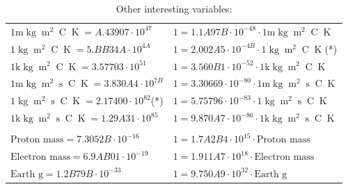 \begin{center}
\begin{longtable}{l l}
{\color{gray}$1 \bm{\mathrm{ m}}\operatorname{kg}{\operatorname{m}^2}{}{\operatorname{C}}{\operatorname{K}} = A.43907\cdot10^{47} $}   & {\color{gray}$ 1 = 1.1A97B\cdot10^{-48} \cdot 1 \bm{\mathrm{ m}}\operatorname{kg}{\operatorname{m}^2}{}{\operatorname{C}}{\operatorname{K}}$}  \\
{\color{black}$1 \bm{\mathrm{ }}\operatorname{kg}{\operatorname{m}^2}{}{\operatorname{C}}{\operatorname{K}} = 5.BB34A\cdot10^{4A} $}   & {\color{black}$ 1 = 2.002A5\cdot10^{-4B} \cdot 1 \bm{\mathrm{ }}\operatorname{kg}{\operatorname{m}^2}{}{\operatorname{C}}{\operatorname{K}}$}\quad(*)\\
{\color{gray}$1 \bm{\mathrm{ k}}\operatorname{kg}{\operatorname{m}^2}{}{\operatorname{C}}{\operatorname{K}} = 3.57703\cdot10^{51} $}   & {\color{gray}$ 1 = 3.560B1\cdot10^{-52} \cdot 1 \bm{\mathrm{ k}}\operatorname{kg}{\operatorname{m}^2}{}{\operatorname{C}}{\operatorname{K}}$}  \\
{\color{gray}$1 \bm{\mathrm{ m}}\operatorname{kg}{\operatorname{m}^2}{\operatorname{s}}{\operatorname{C}}{\operatorname{K}} = 3.830A4\cdot10^{7B} $}   & {\color{gray}$ 1 = 3.30669\cdot10^{-80} \cdot 1 \bm{\mathrm{ m}}\operatorname{kg}{\operatorname{m}^2}{\operatorname{s}}{\operatorname{C}}{\operatorname{K}}$}  \\
{\color{black}$1 \bm{\mathrm{ }}\operatorname{kg}{\operatorname{m}^2}{\operatorname{s}}{\operatorname{C}}{\operatorname{K}} = 2.17400\cdot10^{82} $}\quad(*) & {\color{black}$ 1 = 5.75796\cdot10^{-83} \cdot 1 \bm{\mathrm{ }}\operatorname{kg}{\operatorname{m}^2}{\operatorname{s}}{\operatorname{C}}{\operatorname{K}}$}  \\
{\color{gray}$1 \bm{\mathrm{ k}}\operatorname{kg}{\operatorname{m}^2}{\operatorname{s}}{\operatorname{C}}{\operatorname{K}} = 1.29A31\cdot10^{85} $}   & {\color{gray}$ 1 = 9.870A7\cdot10^{-86} \cdot 1 \bm{\mathrm{ k}}\operatorname{kg}{\operatorname{m}^2}{\operatorname{s}}{\operatorname{C}}{\operatorname{K}}$}  \\
\caption*{Other interesting variables:}\\{\color{black}$\textrm{Proton mass} = 7.3052B\cdot10^{-16} $}   & {\color{black}$ 1 = 1.7A2B4\cdot10^{15} \cdot \textrm{Proton mass}$}  \\
{\color{black}$\textrm{Electron mass} = 6.9AB01\cdot10^{-19} $}   & {\color{black}$ 1 = 1.911A7\cdot10^{18} \cdot \textrm{Electron mass}$}  \\
{\color{black}$\textrm{Earth g} = 1.2B79B\cdot10^{-33} $}   & {\color{black}$ 1 = 9.750A9\cdot10^{32} \cdot \textrm{Earth g}$}  \\

\end{longtable}
\end{center}
